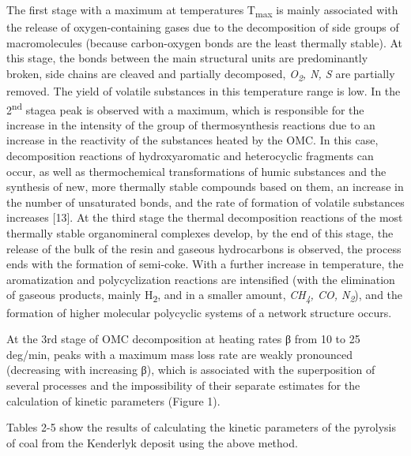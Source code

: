 \begin{multicols}{2}
The first stage with a maximum at temperatures T\textsubscript{max} is
mainly associated with the release of oxygen-containing gases due to the
decomposition of side groups of macromolecules (because carbon-oxygen
bonds are the least thermally stable). At this stage, the bonds between
the main structural units are predominantly broken, side chains are
cleaved and partially decomposed, \emph{O\textsubscript{2}, N, S} are
partially removed. The yield of volatile substances in this temperature
range is low. In the 2\textsuperscript{nd} stagea peak is observed with
a maximum, which is responsible for the increase in the intensity of the
group of thermosynthesis reactions due to an increase in the reactivity
of the substances heated by the OMC. In this case, decomposition
reactions of hydroxyaromatic and heterocyclic fragments can occur, as
well as thermochemical transformations of humic substances and the
synthesis of new, more thermally stable compounds based on them, an
increase in the number of unsaturated bonds, and the rate of formation
of volatile substances increases {[}13{]}. At the third stage the
thermal decomposition reactions of the most thermally stable
organomineral complexes develop, by the end of this stage, the release
of the bulk of the resin and gaseous hydrocarbons is observed, the
process ends with the formation of semi-coke. With a further increase in
temperature, the aromatization and polycyclization reactions are
intensified (with the elimination of gaseous products, mainly
H\textsubscript{2}, and in a smaller amount, \emph{CH\textsubscript{4},
CO, N\textsubscript{2}}), and the formation of higher molecular
polycyclic systems of a network structure occurs.

At the 3rd stage of OMC decomposition at heating rates β from 10 to 25
deg/min, peaks with a maximum mass loss rate are weakly pronounced
(decreasing with increasing β), which is associated with the
superposition of several processes and the impossibility of their
separate estimates for the calculation of kinetic parameters (Figure 1).

Tables 2-5 show the results of calculating the kinetic parameters of the
pyrolysis of coal from the Kenderlyk deposit using the above method.
\end{multicols}

